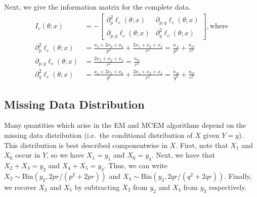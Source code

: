 \documentclass[11pt, oneside]{article}   	%
\begin{document}
\begin{appendices}
    Next, we give the information matrix for the complete data.
    \begin{align}
        I_c(\theta;x) &= - \begin{bmatrix}
            \partial^2_p \ell_c(\theta; x) & \partial_{p,q} \ell_c(\theta; x)\\
            \partial_{p,q} \ell_c(\theta; x) & \partial^2_q \ell_c(\theta; x)
        \end{bmatrix} \mathrm{, where}\\
        \partial^2_p \ell_c(\theta; x) &=  \frac{x_2 + 2 x_3 + x_6}{p^2} + \frac{2x_1 + x_2 + x_4}{r^2} = \frac{n_A}{p^2} + \frac{n_O}{r^2}\\
        \partial_{p,q} \ell_c(\theta; x) &=   \frac{2x_1 + x_2 + x_4}{r^2} = \frac{n_O}{r^2}\\
        \partial^2_q \ell_c(\theta; x) &=  \frac{x_4 + 2 x_5 + x_6}{q^2} + \frac{2x_1 + x_2 + x_4}{r^2} = \frac{n_B}{q^2} + \frac{n_O}{r^2}
    \end{align}
    

    \subsection{Missing Data Distribution}
    \label{app:blood_miss}

    Many quantities which arise in the EM and MCEM algorithms depend on the missing data distribution (i.e.\ the conditional distribution of $X$ given $Y=y$). This distribution is best described componentwise in $X$. First, note that $X_1$ and $X_6$ occur in $Y$, so we have $X_1 = y_1$ and $X_6 = y_4$. Next, we have that $X_2 + X_3 = y_2$ and $X_4 + X_5 = y_3$. Thus, we can write $X_2 \sim \mathrm{Bin}(y_2, 2pr / (p^2 + 2pr))$ and $X_4 \sim \mathrm{Bin}(y_3, 2qr / (q^2 + 2qr))$. Finally, we recover $X_3$ and $X_5$ by subtracting $X_2$ from $y_2$ and $X_4$ from $y_3$ respectively.


\end{appendices}
\end{document}
